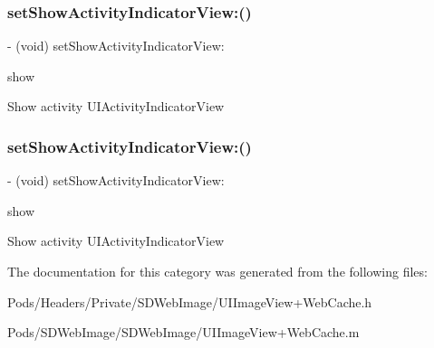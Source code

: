 \subsubsection{\texorpdfstring{set\+Show\+Activity\+Indicator\+View\+:()}{setShowActivityIndicatorView:()}\hspace{0.1cm}{\footnotesize\ttfamily [2/3]}}
{\footnotesize\ttfamily -\/ (void) set\+Show\+Activity\+Indicator\+View\+: \begin{DoxyParamCaption}\item[{(B\+O\+OL)}]{show }\end{DoxyParamCaption}}

Show activity U\+I\+Activity\+Indicator\+View \mbox{\label{category_u_i_image_view_07_web_cache_08_a9f8a8476a2e362282980bfd4fd4cdb1a}} 
\subsubsection{\texorpdfstring{set\+Show\+Activity\+Indicator\+View\+:()}{setShowActivityIndicatorView:()}\hspace{0.1cm}{\footnotesize\ttfamily [3/3]}}
{\footnotesize\ttfamily -\/ (void) set\+Show\+Activity\+Indicator\+View\+: \begin{DoxyParamCaption}\item[{(B\+O\+OL)}]{show }\end{DoxyParamCaption}}

Show activity U\+I\+Activity\+Indicator\+View 

The documentation for this category was generated from the following files\+:\begin{DoxyCompactItemize}
\item 
Pods/\+Headers/\+Private/\+S\+D\+Web\+Image/U\+I\+Image\+View+\+Web\+Cache.\+h\item 
Pods/\+S\+D\+Web\+Image/\+S\+D\+Web\+Image/U\+I\+Image\+View+\+Web\+Cache.\+m\end{DoxyCompactItemize}
